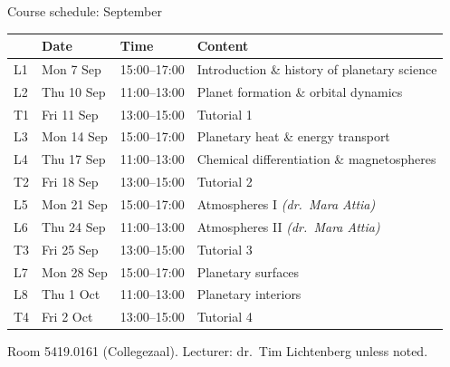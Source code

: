 \documentclass[aspectratio=169, 11pt]{beamer}
\begin{document}
\begin{frame}{Course schedule: September}
  \centering
  \footnotesize
  \setlength{\tabcolsep}{5pt}
  \begin{tabular}{llll}
    \toprule
     & Date & Time & Content \\
    \midrule
    L1  & Mon 7 Sep  & 15:00--17:00 & Introduction \& history of planetary science \\
    L2  & Thu 10 Sep & 11:00--13:00 & Planet formation \& orbital dynamics \\
    T1  & Fri 11 Sep & 13:00--15:00 & Tutorial 1 \\
    L3  & Mon 14 Sep & 15:00--17:00 & Planetary heat \& energy transport \\
    L4  & Thu 17 Sep & 11:00--13:00 & Chemical differentiation \& magnetospheres \\
    T2  & Fri 18 Sep & 13:00--15:00 & Tutorial 2 \\
    L5  & Mon 21 Sep & 15:00--17:00 & Atmospheres I \emph{(dr.\ Mara Attia)} \\
    L6  & Thu 24 Sep & 11:00--13:00 & Atmospheres II \emph{(dr.\ Mara Attia)} \\
    T3  & Fri 25 Sep & 13:00--15:00 & Tutorial 3 \\
    L7  & Mon 28 Sep & 15:00--17:00 & Planetary surfaces \\
    L8  & Thu 1 Oct  & 11:00--13:00 & Planetary interiors \\
    T4  & Fri 2 Oct  & 13:00--15:00 & Tutorial 4 \\
    \bottomrule
  \end{tabular}
  \vskip6pt\relax
  {\footnotesize Room 5419.0161 (Collegezaal). Lecturer: dr.\ Tim Lichtenberg unless noted.}
\end{frame}
\end{document}
